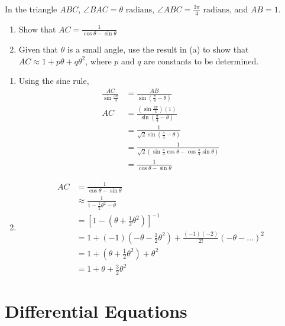 \documentclass[11pt,a4paper]{book}
\begin{document}
\begin{example}

In the triangle $ABC$, $\angle BAC=\theta\text{ radians}$, ${\displaystyle \angle ABC=\frac{3\pi}{4}\text{ radians}}$,
and $AB=1$. \begin{enumerate}[label=(\roman*)]
\item Show that ${\displaystyle AC=\frac{1}{\cos\theta-\sin\theta}}$
\item Given that $\theta$ is a small angle, use the result in (a) to show that $AC\approx1+p\theta+q\theta^{2}$, where $p$ and $q$ are constants to be determined.
\end{enumerate}

\Solution


\begin{enumerate}[label=(\alph*)]
\item Using the sine rule,
\begin{align*}
\frac{AC}{\sin\frac{3\pi}{4}} & =\frac{AB}{\sin\left(\frac{\pi}{4}-\theta\right)}\\
AC & =\frac{\left(\sin\frac{3\pi}{4}\right)\left(1\right)}{\sin\left(\frac{\pi}{4}-\theta\right)}\\
 & =\frac{1}{\sqrt{2}\sin\left(\frac{\pi}{4}-\theta\right)}\\
 & =\frac{1}{\sqrt{2}\left(\sin\frac{\pi}{4}\cos\theta-\cos\frac{\pi}{4}\sin\theta\right)}\\
 & =\frac{1}{\cos\theta-\sin\theta}
\end{align*}

\item
\begin{align*}
AC & =\frac{1}{\cos\theta-\sin\theta}\\
 & \approx\frac{1}{1-\frac{1}{2}\theta^{2}-\theta}\\
 & =\left[1-\left(\theta+\frac{1}{2}\theta^{2}\right)\right]^{-1}\\
 & =1+\left(-1\right)\left(-\theta-\frac{1}{2}\theta^{2}\right)+\frac{\left(-1\right)\left(-2\right)}{2!}\left(-\theta-\ldots\right)^{2}\\
 & =1+\left(\theta+\frac{1}{2}\theta^{2}\right)+\theta^{2}\\
 & =1+\theta+\frac{3}{2}\theta^{2}
\end{align*}
\end{enumerate}

\end{example}


\chapter{Differential Equations}
\end{document}
